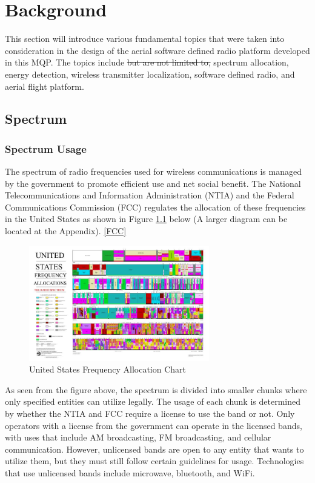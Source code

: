 \chapter{Background}
This section will introduce various fundamental topics that were taken into consideration in the design of the aerial software defined radio platform developed in this MQP. The topics include \sout{but are not limited to,} spectrum allocation, energy detection, wireless transmitter localization, software defined radio, and aerial flight platform.

\section{Spectrum}
\subsection{Spectrum Usage}
The spectrum of radio frequencies used for wireless communications is managed by the government to promote efficient use and net social benefit. The National Telecommunications and Information Administration (NTIA) and the Federal Communications Commission (FCC) regulates the allocation of these frequencies in the United States as shown in Figure \ref{fig:freq_chart} below (A larger diagram can be located at the Appendix). \ref{FCC}
\begin{figure}[ht]
\centering
\includegraphics[width=0.70\textwidth]{img/the_radio_spectrum.jpg}
\caption{United States Frequency Allocation Chart}
\label{fig:freq_chart}
\end{figure}
As seen from the figure above, the spectrum is divided into smaller chunks where only specified entities can utilize legally. The usage of each chunk is determined by whether the NTIA and FCC require a license to use the band or not. Only operators with a license from the government can operate in the licensed bands, with uses that include AM broadcasting, FM broadcasting, and cellular communication. However, unlicensed bands are open to any entity that wants to utilize them, but they must still follow certain guidelines for usage. Technologies that use unlicensed bands include microwave, bluetooth, and WiFi.

